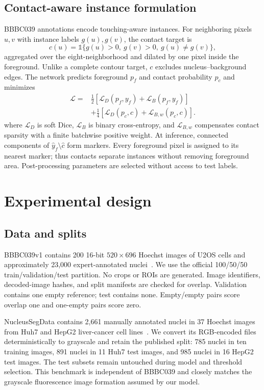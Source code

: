 \documentclass{article}
\begin{document}
\subsection{Contact-aware instance formulation}
BBBC039 annotations encode touching-aware instances. For neighboring pixels $u,v$ with instance labels $g(u),g(v)$, the contact target is
\begin{equation}
c(u)=\mathbb 1\{g(u)>0,\ g(v)>0,\ g(u)\ne g(v)\},
\end{equation}
aggregated over the eight-neighborhood and dilated by one pixel inside the foreground. Unlike a complete contour target, $c$ excludes nucleus--background edges. The network predicts foreground $p_f$ and contact probability $p_c$ and minimizes
\begin{equation}
\begin{split}
\mathcal L={}&\tfrac12[\mathcal L_D(p_f,y_f)+\mathcal L_B(p_f,y_f)]\\
&+\tfrac14[\mathcal L_D(p_c,c)+\mathcal L_{B,w}(p_c,c)].
\end{split}
\end{equation}
where $\mathcal L_D$ is soft Dice, $\mathcal L_B$ is binary cross-entropy, and $\mathcal L_{B,w}$ compensates contact sparsity with a finite batchwise positive weight. At inference, connected components of $\hat y_f\setminus\hat c$ form markers. Every foreground pixel is assigned to its nearest marker; thus contacts separate instances without removing foreground area. Post-processing parameters are selected without access to test labels.

\section{Experimental design}
\subsection{Data and splits}
BBBC039v1 contains 200 16-bit $520\!\times\!696$ Hoechst images of U2OS cells and approximately 23,000 expert-annotated nuclei~\cite{ljosa2012annotated,caicedo2019nucleus}. We use the official 100/50/50 train/validation/test partition. No crops or ROIs are generated. Image identifiers, decoded-image hashes, and split manifests are checked for overlap. Validation contains one empty reference; test contains none. Empty/empty pairs score overlap one and one-empty pairs score zero.

NucleusSegData contains 2,661 manually annotated nuclei in 37 Hoechst images from Huh7 and HepG2 liver-cancer cell lines~\cite{arslan2013graphs,koyuncu2018object}. We convert its RGB-encoded files deterministically to grayscale and retain the published split: 785 nuclei in ten training images, 891 nuclei in 11 Huh7 test images, and 985 nuclei in 16 HepG2 test images. The test subsets remain untouched during model and threshold selection. This benchmark is independent of BBBC039 and closely matches the grayscale fluorescence image formation assumed by our model.
\end{document}

